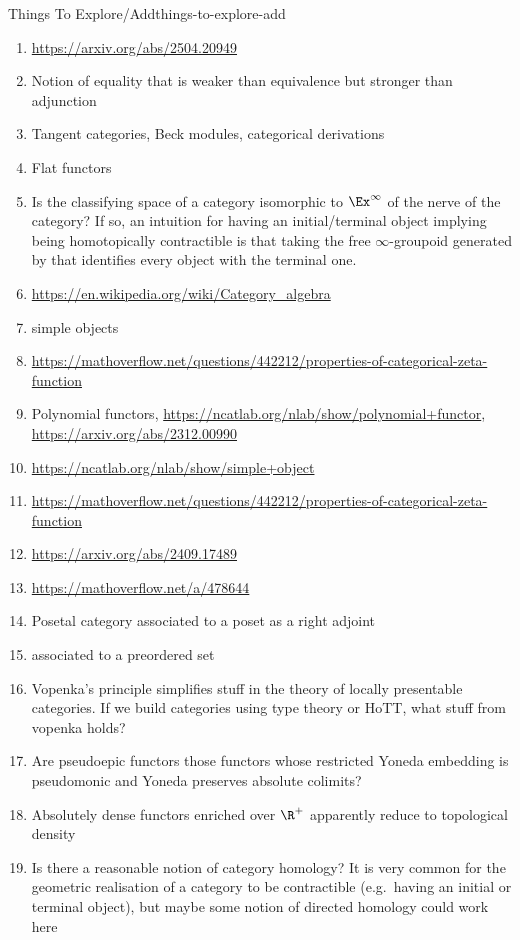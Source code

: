 \begin{remark}{Things To Explore/Add}{things-to-explore-add}
\begin{enumerate}
\begin{enumerate}
            \end{enumerate}
        \item \url{https://arxiv.org/abs/2504.20949}
        \item Notion of equality that is weaker than equivalence but stronger than adjunction
        \item Tangent categories, Beck modules, categorical derivations
        \item Flat functors
        \item Is the classifying space of a category isomorphic to $\Ex^{\infty}$ of the nerve of the category? If so, an intuition for having an initial/terminal object implying being homotopically contractible is that taking the free $\infty$-groupoid generated by that identifies every object with the terminal one.
        \item \url{https://en.wikipedia.org/wiki/Category_algebra}
        \item simple objects
        \item \url{https://mathoverflow.net/questions/442212/properties-of-categorical-zeta-function}
        \item Polynomial functors, \url{https://ncatlab.org/nlab/show/polynomial+functor}, \url{https://arxiv.org/abs/2312.00990}
        \item \url{https://ncatlab.org/nlab/show/simple+object}
        \item \url{https://mathoverflow.net/questions/442212/properties-of-categorical-zeta-function}
        \item \url{https://arxiv.org/abs/2409.17489}
        \item \url{https://mathoverflow.net/a/478644}
        \item Posetal category associated to a poset as a right adjoint
        \item {} associated to a preordered set
        \item Vopenka's principle simplifies stuff in the theory of locally presentable categories. If we build categories using type theory or HoTT, what stuff from vopenka holds?
        \item Are pseudoepic functors those functors whose restricted Yoneda embedding is pseudomonic and Yoneda preserves absolute colimits?
        \item Absolutely dense functors enriched over $\R^{+}$ apparently reduce to topological density
        \item Is there a reasonable notion of category homology? It is very common for the geometric realisation of a category to be contractible (e.g.\ having an initial or terminal object), but maybe some notion of directed homology could work here

\end{enumerate}
\end{remark}
